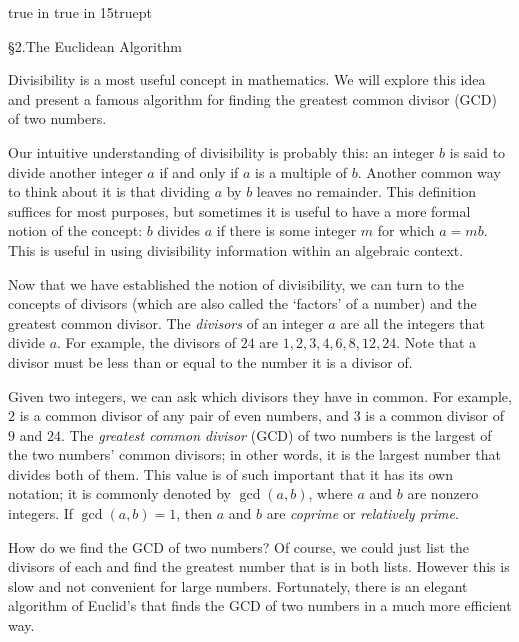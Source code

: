 
 true in
 true in
\parindent15truept
\footline{}

\doublecolumns
\beginsection\S{2}.\enspace The Euclidean Algorithm

Divisibility is a most useful concept in mathematics.
We will explore this idea and present a famous algorithm for finding the
greatest common divisor (GCD) of two numbers. 

Our intuitive understanding of divisibility is probably this: an
integer $b$ is said to divide another integer $a$ if and only if
$a$ is a multiple of $b$. 
Another common way to think about it is that dividing $a$ by $b$
leaves no remainder. This definition suffices for most purposes,
but sometimes it is useful to have a more formal notion of the concept:
$b$ divides $a$ if there is some integer $m$ for which $a=mb$. This
is useful in using divisibility information within an algebraic context.

Now that we have established the notion of
divisibility, we can turn to the concepts of divisors (which are also
called the `factors' of a number) and the greatest common divisor.
The {\it divisors} of an integer $a$ are all the integers that divide $a$.
For example, the divisors of $24$ are $1,2,3,4,6,8,12,24$. Note that a divisor must
be less than or equal to the number it is a divisor of.

Given two integers, we can ask which divisors they have in common.
For example, $2$ is a common divisor of any pair of even numbers, and $3$ is
a common divisor of $9$ and $24$. The {\it greatest common divisor} (GCD) of
two numbers is the largest of the two numbers' common divisors; in other words,
it is the largest number that divides both of them. This value is of such
important that it has its own notation; it is commonly denoted by $\gcd(a,b)$, where
$a$ and $b$ are nonzero integers. If $\gcd(a,b)=1$, then $a$ and $b$ are {\it coprime}
or {\it relatively prime}.

How do we find the GCD of two numbers? Of course, we could just list the divisors
of each and find the greatest number that is in both lists. However this is slow
and not convenient for large numbers. Fortunately, there is an elegant algorithm of
Euclid's that finds the GCD of two numbers in a much more efficient way.

